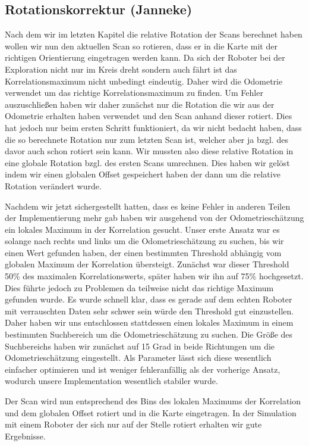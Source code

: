 \subsection{Rotationskorrektur (Janneke)}

Nach dem wir im letzten Kapitel die relative Rotation der Scans berechnet haben wollen wir nun den aktuellen Scan so rotieren, dass er in die Karte mit der richtigen Orientierung eingetragen werden kann. Da sich der Roboter bei der Exploration nicht nur im Kreis dreht sondern auch fährt ist das Korrelationsmaximum nicht unbedingt eindeutig. Daher wird die Odometrie verwendet um das richtige Korrelationsmaximum zu finden. Um Fehler auszuschließen haben wir daher zunächst nur die Rotation die wir aus der Odometrie erhalten haben verwendet und den Scan anhand dieser rotiert. Dies hat jedoch nur beim ersten Schritt funktioniert, da wir nicht bedacht haben, dass die so berechnete Rotation nur zum letzten Scan ist, welcher aber ja bzgl. des davor auch schon rotiert sein kann. Wir mussten also diese relative Rotation in eine globale Rotation bzgl. des ersten Scans umrechnen. Dies haben wir gelöst indem wir einen globalen Offset gespeichert haben der dann um die relative Rotation verändert wurde.

Nachdem wir jetzt sichergestellt hatten, dass es keine Fehler in anderen Teilen der Implementierung mehr gab haben wir ausgehend von der Odometrieschätzung ein lokales Maximum in der Korrelation gesucht. Unser erste Ansatz war es solange nach rechts und links um die Odometrieschätzung zu suchen, bis wir einen Wert gefunden haben, der einen bestimmten Threshold abhängig vom globalen Maximum der Korrelation übersteigt. Zunächst war dieser Threshold 50\% des maximalen Korrelationswerts, später haben wir ihn auf 75\% hochgesetzt. Dies führte jedoch zu Problemen da teilweise nicht das richtige Maximum gefunden wurde. Es wurde schnell klar, dass es gerade auf dem echten Roboter mit verrauschten Daten sehr schwer sein würde den Threshold gut einzustellen. Daher haben wir uns entschlossen stattdessen einen lokales Maximum in einem bestimmten Suchbereich um die Odometrieschätzung zu suchen. Die Größe des Suchbereichs haben wir zunächst auf 15 Grad in beide Richtungen um die Odometrieschätzung eingestellt. Als Parameter lässt sich diese wesentlich einfacher optimieren und ist weniger fehleranfällig als der vorherige Ansatz, wodurch unsere Implementation wesentlich stabiler wurde.

Der Scan wird nun entsprechend des Bins des lokalen Maximums der Korrelation und dem globalen Offset rotiert und in die Karte eingetragen. In der Simulation mit einem Roboter der sich nur auf der Stelle rotiert erhalten wir gute Ergebnisse.